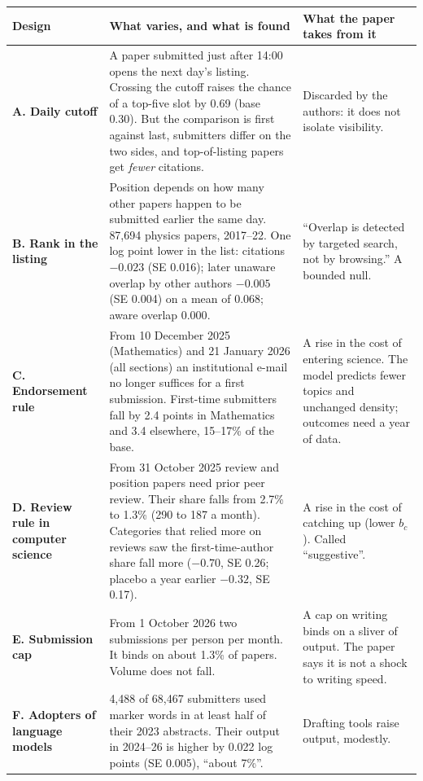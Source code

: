 \begin{center}\small
\setlength{\tabcolsep}{4pt}
\begin{tabularx}{\textwidth}{@{}P{1.05in}P{2.25in}L@{}}
\toprule
Design & What varies, and what is found & What the paper takes from it \\
\midrule
\textbf{A. Daily cutoff} & A paper submitted just after 14:00 opens the next day's listing. Crossing the cutoff raises the chance of a top-five slot by 0.69 (base 0.30). But the comparison is first against last, submitters differ on the two sides, and top-of-listing papers get \emph{fewer} citations. & Discarded by the authors: it does not isolate visibility. \\
\textbf{B. Rank in the listing} & Position depends on how many other papers happen to be submitted earlier the same day. 87,694 physics papers, 2017--22. One log point lower in the list: citations $-0.023$ (SE 0.016); later unaware overlap by other authors $-0.005$ (SE 0.004) on a mean of 0.068; aware overlap $0.000$. & ``Overlap is detected by targeted search, not by browsing.'' A bounded null. \\
\textbf{C. Endorsement rule} & From 10 December 2025 (Mathematics) and 21 January 2026 (all sections) an institutional e-mail no longer suffices for a first submission. First-time submitters fall by 2.4 points in Mathematics and 3.4 elsewhere, 15--17\% of the base. & A rise in the cost of entering science. The model predicts fewer topics and unchanged density; outcomes need a year of data. \\
\textbf{D. Review rule in computer science} & From 31 October 2025 review and position papers need prior peer review. Their share falls from 2.7\% to 1.3\% (290 to 187 a month). Categories that relied more on reviews saw the first-time-author share fall more ($-0.70$, SE 0.26; placebo a year earlier $-0.32$, SE 0.17). & A rise in the cost of catching up (lower $b_c$). Called ``suggestive''. \\
\textbf{E. Submission cap} & From 1 October 2026 two submissions per person per month. It binds on about 1.3\% of papers. Volume does not fall. & A cap on writing binds on a sliver of output. The paper says it is not a shock to writing speed. \\
\textbf{F. Adopters of language models} & 4,488 of 68,467 submitters used marker words in at least half of their 2023 abstracts. Their output in 2024--26 is higher by 0.022 log points (SE 0.005), ``about 7\%''. & Drafting tools raise output, modestly. \\
\bottomrule
\end{tabularx}
\end{center}


